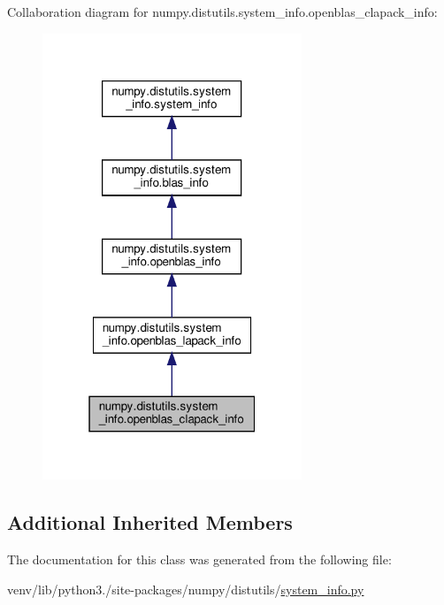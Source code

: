 Collaboration diagram for numpy.\+distutils.\+system\+\_\+info.\+openblas\+\_\+clapack\+\_\+info\+:
\nopagebreak
\begin{figure}[H]
\begin{center}
\leavevmode
\includegraphics[width=220pt]{classnumpy_1_1distutils_1_1system__info_1_1openblas__clapack__info__coll__graph}
\end{center}
\end{figure}
\subsection*{Additional Inherited Members}


The documentation for this class was generated from the following file\+:\begin{DoxyCompactItemize}
\item 
venv/lib/python3./site-\/packages/numpy/distutils/\hyperlink{system__info_8py}{system\+\_\+info.\+py}\end{DoxyCompactItemize}
